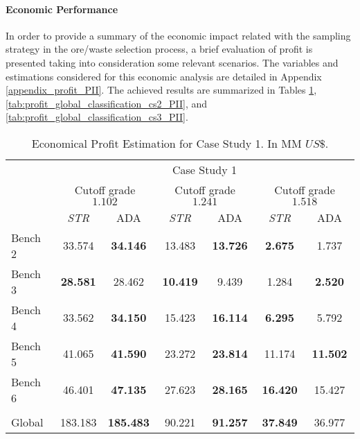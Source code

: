 \paragraph{Economic Performance}

In order to provide a summary of the economic impact related with the sampling strategy in the ore/waste selection process, a brief evaluation of profit is presented taking into consideration some relevant scenarios. The variables and estimations considered for this economic analysis are detailed in Appendix \ref{appendix_profit_PII}. %
The achieved results are summarized in Tables \ref{tab:profit_global_classification_cs1_PII}, \ref{tab:profit_global_classification_cs2_PII}, and \ref{tab:profit_global_classification_cs3_PII}.

\begin{table}
	\caption[Economic Profit Estimation for Case Study 1]{Economical Profit Estimation for Case Study 1. In MM $US\$$.}
	\label{tab:profit_global_classification_cs1_PII}
	\begin{center}
		\begin{tabular}{lcccccc}\toprule
			& \multicolumn{6}{c}{Case Study 1} \\
			& \multicolumn{2}{c}{Cutoff grade $1.102$} & \multicolumn{2}{c}{Cutoff grade $1.241$}& \multicolumn{2}{c}{Cutoff grade $1.518$}\\
			& {\emph{STR}} & {ADA} & {\emph{STR}} & {ADA} & {\emph{STR}} & {ADA}\\\midrule
			Bench 2 &  33.574 &  \textbf{34.146} &  13.483   & \textbf{13.726}  &   \textbf{2.675} &  1.737 \\
			Bench 3 &  \textbf{28.581} &  28.462 &  \textbf{10.419} & 9.439  &  1.284 &  \textbf{2.520}\\
			Bench 4 &  33.562 &  \textbf{34.150} &  15.423 & \textbf{16.114} &  \textbf{6.295} &  5.792\\
			Bench 5 &  41.065 &  \textbf{41.590}  & 23.272 & \textbf{23.814}  &   11.174 &  \textbf{11.502}\\
			Bench 6 &  46.401 &  \textbf{47.135} &  27.623 & \textbf{28.165} &  \textbf{16.420} &  15.427\\
			\hline \\
			Global  &  183.183 &  \textbf{185.483}  & 90.221 & \textbf{91.257} &  \textbf{37.849} &  36.977\\
			\bottomrule
		\end{tabular}
	\end{center}
\end{table}

